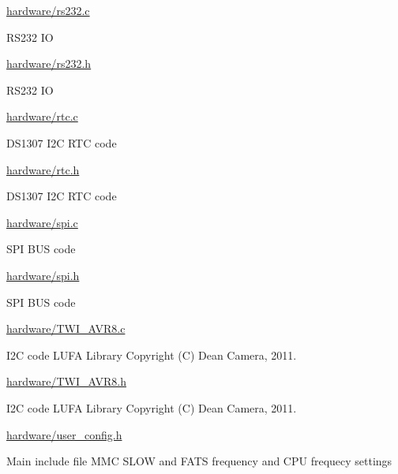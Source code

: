 \begin{DoxyItemize}
\begin{DoxyItemize}
\begin{DoxyItemize}
\end{DoxyItemize}
\item \hyperlink{rs232_8c}{hardware/rs232.\+c}
\begin{DoxyItemize}
\item R\+S232 IO
\end{DoxyItemize}
\item \hyperlink{rs232_8h}{hardware/rs232.\+h}
\begin{DoxyItemize}
\item R\+S232 IO
\end{DoxyItemize}
\item \hyperlink{rtc_8c}{hardware/rtc.\+c}
\begin{DoxyItemize}
\item D\+S1307 I2C R\+TC code
\end{DoxyItemize}
\item \hyperlink{rtc_8h}{hardware/rtc.\+h}
\begin{DoxyItemize}
\item D\+S1307 I2C R\+TC code
\end{DoxyItemize}
\item \hyperlink{spi_8c}{hardware/spi.\+c}
\begin{DoxyItemize}
\item S\+PI B\+US code
\end{DoxyItemize}
\item \hyperlink{spi_8h}{hardware/spi.\+h}
\begin{DoxyItemize}
\item S\+PI B\+US code
\end{DoxyItemize}
\item \hyperlink{TWI__AVR8_8c}{hardware/\+T\+W\+I\+\_\+\+A\+V\+R8.\+c}
\begin{DoxyItemize}
\item I2C code L\+U\+FA Library Copyright (C) Dean Camera, 2011.
\end{DoxyItemize}
\item \hyperlink{TWI__AVR8_8h}{hardware/\+T\+W\+I\+\_\+\+A\+V\+R8.\+h}
\begin{DoxyItemize}
\item I2C code L\+U\+FA Library Copyright (C) Dean Camera, 2011.
\end{DoxyItemize}
\item \hyperlink{user__config_8h}{hardware/user\+\_\+config.\+h}
\begin{DoxyItemize}
\item Main include file M\+MC S\+L\+OW and F\+A\+TS frequency and C\+PU frequecy settings

\end{DoxyItemize}
\end{DoxyItemize}
\end{DoxyItemize}
